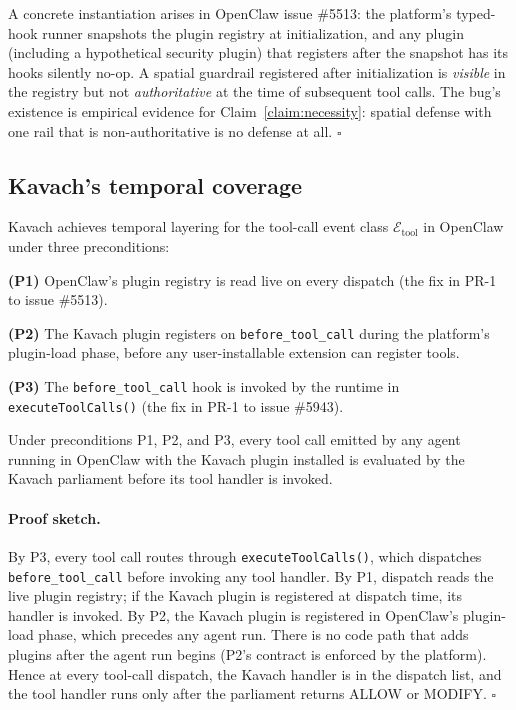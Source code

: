 A concrete instantiation arises in OpenClaw issue \#5513: the platform's
typed-hook runner snapshots the plugin registry at initialization, and any
plugin (including a hypothetical security plugin) that registers after the
snapshot has its hooks silently no-op. A spatial guardrail registered after
initialization is \emph{visible} in the registry but not \emph{authoritative}
at the time of subsequent tool calls. The bug's existence is empirical
evidence for Claim~\ref{claim:necessity}: spatial defense with one rail
that is non-authoritative is no defense at all. \(\square\)

\subsection{Kavach's temporal coverage}

Kavach achieves temporal layering for the tool-call event class
\(\mathcal{E}_{\text{tool}}\) in OpenClaw under three preconditions:

\textbf{(P1)} OpenClaw's plugin registry is read live on every dispatch
(the fix in PR-1 to issue \#5513).

\textbf{(P2)} The Kavach plugin registers on \texttt{before\_tool\_call}
during the platform's plugin-load phase, before any user-installable
extension can register tools.

\textbf{(P3)} The \texttt{before\_tool\_call} hook is invoked by the
runtime in \texttt{executeToolCalls()} (the fix in PR-1 to issue \#5943).

\begin{theorem}
\label{thm:coverage}
Under preconditions P1, P2, and P3, every tool call emitted by any agent
running in OpenClaw with the Kavach plugin installed is evaluated by the
Kavach parliament before its tool handler is invoked.
\end{theorem}

\paragraph{Proof sketch.} By P3, every tool call routes through
\texttt{executeToolCalls()}, which dispatches \texttt{before\_tool\_call}
before invoking any tool handler. By P1, dispatch reads the live plugin
registry; if the Kavach plugin is registered at dispatch time, its handler
is invoked. By P2, the Kavach plugin is registered in OpenClaw's
plugin-load phase, which precedes any agent run. There is no code path
that adds plugins after the agent run begins (P2's contract is enforced
by the platform). Hence at every tool-call dispatch, the Kavach handler
is in the dispatch list, and the tool handler runs only after the
parliament returns ALLOW or MODIFY. \(\square\)

